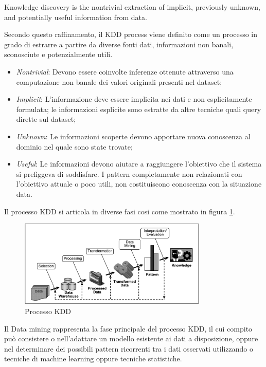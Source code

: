\begin{mydef}
	Knowledge discovery is the nontrivial extraction of implicit, previously unknown, and potentially useful information from data.\cite{citeulike:1550195} 
\end{mydef} 
Secondo questo raffinamento, il KDD process viene definito come un processo in grado di estrarre a partire da diverse fonti dati, informazioni non banali, sconosciute e potenzialmente utili. 
\begin{itemize}
	\item \emph{Nontrivial}: Devono essere coinvolte inferenze ottenute attraverso una computazione non banale dei valori originali presenti nel dataset;
	\item \emph{Implicit}: L'informazione deve essere implicita nei dati e non esplicitamente formulata; le informazioni esplicite sono estratte da altre tecniche quali query dirette sul dataset;
	\item \emph{Unknown}: Le informazioni scoperte devono apportare nuova conoscenza al dominio nel quale sono state trovate;
	\item \emph{Useful}: Le informazioni devono aiutare a raggiungere l'obiettivo che il sistema si prefiggeva di soddisfare. I pattern completamente non relazionati con l'obiettivo attuale o poco utili, non costituiscono conoscenza con la situazione data.
\end{itemize}
Il processo KDD si articola in diverse fasi cosi come mostrato in figura \ref{kddprocess}.
\begin{figure}[hbtp]
\centering
\includegraphics[width=0.8\textwidth]{./images/kddprocess.png}
\caption{Processo KDD}
\label{kddprocess}
\end{figure}
Il Data mining rappresenta la fase principale del processo KDD, il cui compito può consistere o nell'adattare un modello esistente ai dati a disposizione, oppure nel determinare dei possibili pattern ricorrenti tra i dati osservati utilizzando o tecniche di machine learning oppure tecniche statistiche. 

